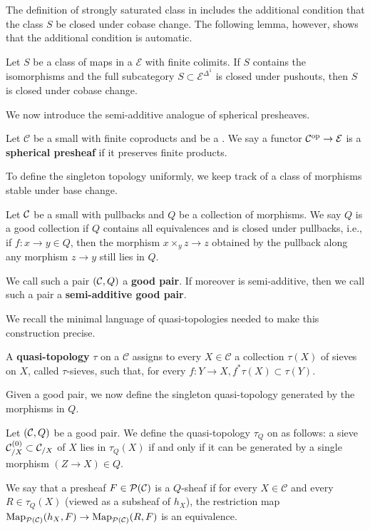 \documentclass[a4paper,10pt, oneside]{amsart}
\begin{document}
\begin{rem}
		The definition of strongly saturated class in \cite[Definition 5.5.4.5]{htt} includes the additional condition that the class $S$ be closed under cobase change. The following lemma, however, shows that the additional condition is automatic.
\end{rem}
	\begin{lem}
		Let $S$ be a class of maps in a \infcat   $\mathcal{E}$ with finite colimits. If $S$ contains the isomorphisms and the full subcategory $S \subset \mathcal{E}^{\Delta^1}$ is closed under pushouts, then $S$ is closed under cobase change.
	\end{lem}
	We now introduce the semi-additive analogue of spherical presheaves.
	\begin{de}
		Let $\mathcal{C}$ be a small  \infcat with finite coproducts and \mce be a \infcat. We say a functor $\mathcal{C}^{\mathrm{op}}\to \mathcal{E}$ is a \textbf{spherical presheaf} if it preserves finite products.
	\end{de}
To define the singleton topology uniformly, we keep track of a class of morphisms stable under base change.
	\begin{de}\label{goodpair}
		Let $\mathcal{C}$ be a small \infcat with pullbacks and $Q$ be a collection of morphisms. We say $Q$ is a good collection if $Q$ contains all equivalences and is closed under pullbacks, i.e., if $f:x\to y\in Q$, then the morphism $x\times_y z\to z$ obtained by the pullback along any morphism $z\to y$ still lies in $Q$.
		
		We call such a pair $(\mathcal{C},Q)$ a \textbf{good pair}. If moreover \mcc is semi-additive, then we call such a pair a \textbf{semi-additive good pair}.
	\end{de}
	We recall the minimal language of quasi-topologies needed to make this construction precise.
\begin{de}
	A \textbf{quasi-topology} $\tau$ on a \infcat $\mathcal{C}$ assigns to every $X \in \mathcal{C}$ a collection $\tau(X)$ of sieves on $X$, called $\tau$-sieves, such that, for every $f: Y \rightarrow X, f^* \tau(X) \subset \tau(Y)$.
\end{de}
Given a good pair, we now define the singleton quasi-topology generated by the morphisms in \(Q\).
	\begin{de}
	Let $(\mathcal{C},Q)$ be a good pair. We define the quasi-topology $\tau_Q$ on \mcc as follows: a sieve $\mathcal{C}^{(0)}_{/X}\subset\mathcal{C}_{/X}$ of $X$ lies in $\tau_Q(X)$ if and only if it can be generated by a single morphism $(Z\to X)\in Q$.
	
	We say that a presheaf $F\in \mathcal{P}(\mathcal{C})$ is a $Q$-sheaf if for every $X \in \mathcal{C}$ and every $R \in \tau_Q(X)$ (viewed as a subsheaf of $h_X$), the restriction map $\operatorname{Map}_{\mathcal{P}(\mathcal{C})}(h_X, F) \rightarrow \operatorname{Map}_{\mathcal{P}(\mathcal{C})}(R, F)$ is an equivalence.
	\end{de}
\end{document}
